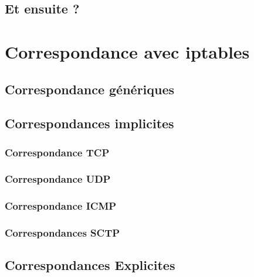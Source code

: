 \documentclass[a4paper,11pt]{report}
\begin{document}
\section{Et ensuite ?}


\chapter{Correspondance avec iptables}

\section{Correspondance génériques}

\section{Correspondances implicites}

\subsection{Correspondance TCP}

\subsection{Correspondance UDP}

\subsection{Correspondance ICMP}

\subsection{Correspondances SCTP}

\section{Correspondances Explicites}




 
\end{document}

